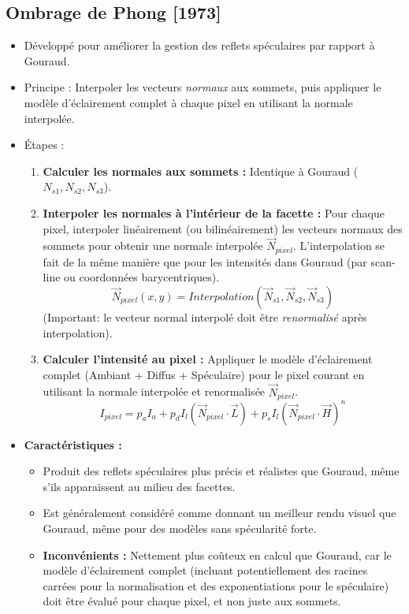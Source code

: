 \documentclass{article}
\begin{document}
\subsection{Ombrage de Phong [1973]}
\begin{itemize}
    \item Développé pour améliorer la gestion des reflets spéculaires par rapport à Gouraud.
    \item Principe : Interpoler les vecteurs \textit{normaux} aux sommets, puis appliquer le modèle d'éclairement complet à chaque pixel en utilisant la normale interpolée.
    \item Étapes :
        \begin{enumerate}
            \item  \textbf{Calculer les normales aux sommets :} Identique à Gouraud ($N_{s1}, N_{s2}, N_{s3}$).
            \item  \textbf{Interpoler les normales à l'intérieur de la facette :} Pour chaque pixel, interpoler linéairement (ou bilinéairement) les vecteurs normaux des sommets pour obtenir une normale interpolée $\vec{N}_{pixel}$. L'interpolation se fait de la même manière que pour les intensités dans Gouraud (par scan-line ou coordonnées barycentriques).
                \[ \vec{N}_{pixel}(x,y) = Interpolation(\vec{N}_{s1}, \vec{N}_{s2}, \vec{N}_{s3}) \]
                (Important: le vecteur normal interpolé doit être \textit{renormalisé} après interpolation).
            \item  \textbf{Calculer l'intensité au pixel :} Appliquer le modèle d'éclairement complet (Ambiant + Diffus + Spéculaire) pour le pixel courant en utilisant la normale interpolée et renormalisée $\vec{N}_{pixel}$.
                \[ I_{pixel} = p_a I_a + p_d I_l (\vec{N}_{pixel} \cdot \vec{L}) + p_s I_l (\vec{N}_{pixel} \cdot \vec{H})^n \]
        \end{enumerate}
    \item \textbf{Caractéristiques :}
        \begin{itemize}
            \item Produit des reflets spéculaires plus précis et réalistes que Gouraud, même s'ils apparaissent au milieu des facettes.
            \item Est généralement considéré comme donnant un meilleur rendu visuel que Gouraud, même pour des modèles sans spécularité forte.
            \item \textbf{Inconvénients :} Nettement plus coûteux en calcul que Gouraud, car le modèle d'éclairement complet (incluant potentiellement des racines carrées pour la normalisation et des exponentiations pour le spéculaire) doit être évalué pour chaque pixel, et non juste aux sommets.
        \end{itemize}
\end{itemize}
\end{document}
